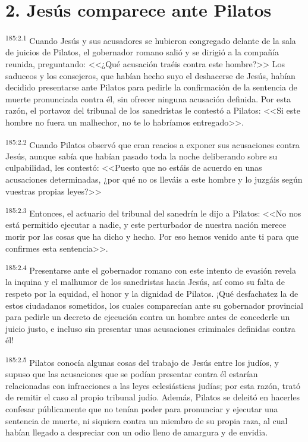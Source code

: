 \section*{2. Jesús comparece ante Pilatos}
\par 
\textsuperscript{185:2.1} Cuando Jesús y sus acusadores se hubieron congregado delante de la sala de juicios de Pilatos, el gobernador romano salió y se dirigió a la compañía reunida, preguntando: <<¿Qué acusación traéis contra este hombre?>> Los saduceos y los consejeros, que habían hecho suyo el deshacerse de Jesús, habían decidido presentarse ante Pilatos para pedirle la confirmación de la sentencia de muerte pronunciada contra él, sin ofrecer ninguna acusación definida. Por esta razón, el portavoz del tribunal de los sanedristas le contestó a Pilatos: <<Si este hombre no fuera un malhechor, no te lo habríamos entregado>>.

\par 
\textsuperscript{185:2.2} Cuando Pilatos observó que eran reacios a exponer sus acusaciones contra Jesús, aunque sabía que habían pasado toda la noche deliberando sobre su culpabilidad, les contestó: <<Puesto que no estáis de acuerdo en unas acusaciones determinadas, ¿por qué no os lleváis a este hombre y lo juzgáis según vuestras propias leyes?>>

\par 
\textsuperscript{185:2.3} Entonces, el actuario del tribunal del sanedrín le dijo a Pilatos: <<No nos está permitido ejecutar a nadie, y este perturbador de nuestra nación merece morir por las cosas que ha dicho y hecho. Por eso hemos venido ante ti para que confirmes esta sentencia>>.

\par 
\textsuperscript{185:2.4} Presentarse ante el gobernador romano con este intento de evasión revela la inquina y el malhumor de los sanedristas hacia Jesús, así como su falta de respeto por la equidad, el honor y la dignidad de Pilatos. ¡Qué desfachatez la de estos ciudadanos sometidos, los cuales comparecían ante su gobernador provincial para pedirle un decreto de ejecución contra un hombre antes de concederle un juicio justo, e incluso sin presentar unas acusaciones criminales definidas contra él!

\par 
\textsuperscript{185:2.5} Pilatos conocía algunas cosas del trabajo de Jesús entre los judíos, y supuso que las acusaciones que se podían presentar contra él estarían relacionadas con infracciones a las leyes eclesiásticas judías; por esta razón, trató de remitir el caso al propio tribunal judío. Además, Pilatos se deleitó en hacerles confesar públicamente que no tenían poder para pronunciar y ejecutar una sentencia de muerte, ni siquiera contra un miembro de su propia raza, al cual habían llegado a despreciar con un odio lleno de amargura y de envidia.

